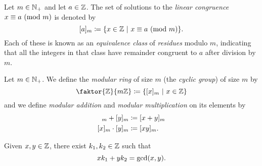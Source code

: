 \begin{definition}
    Let $m \in \mathbb{N}_+$ and let $a \in \mathbb{Z}$.
    The set of solutions to the \emph{linear congruence} $\modulo{x}{a}{m}$ is denoted by
    \[
        [a]_m \defn \set*{x \in \Z \suchthat \modulo{x}{a}{m}}.
    \]
    Each of these is known as an \emph{equivalence class} of \emph{residues} modulo $m$,
    indicating that all the integers in that class have remainder congruent to $a$
    after division by $m$.
\end{definition}

\begin{definition}
    Let $m \in \mathbb{N}_+$.
    We define the \emph{modular ring} of size $m$
    (\aka the \emph{cyclic group}) of size $m$ by
    \begin{equation*}
        \faktor{\Z}{m\Z} \defn \set*{[x]_m \suchthat x \in \Z}
    \end{equation*}
    and we define \emph{modular addition}
    and \emph{modular multiplication}
    on its elements by
    \begin{align*}
        [x]_m + [y]_m &\defn [x + y]_m \\
        [x]_m \cdot [y]_m &\defn [xy]_m.
    \end{align*}
\end{definition}

\begin{theorem}
    Given $x, y \in \mathbb{Z}$, there exist $k_1, k_2 \in \mathbb{Z}$ such that
    \begin{equation*}
        xk_1 + yk_2 = \gcd\pn*{x, y}.
    \end{equation*}
\end{theorem}

